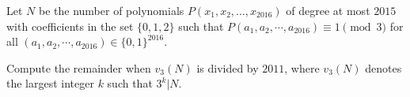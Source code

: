Let $N$ be the number of polynomials $P(x_1, x_2, \dots, x_{2016})$ of degree at most $2015$ with coefficients in the set $\{0, 1, 2 \}$ such that $P(a_1,a_2,\cdots ,a_{2016}) \equiv 1 \pmod{3}$ for all $(a_1,a_2,\cdots ,a_{2016}) \in \{0, 1\}^{2016}.$

Compute the remainder when $v_3(N)$ is divided by $2011$, where $v_3(N)$ denotes the largest integer $k$ such that $3^k | N.$
